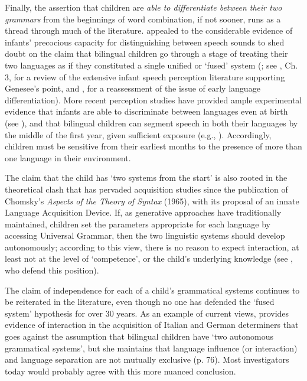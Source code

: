 \documentclass[output=paper]{langscibook}
\begin{document}
Finally, the assertion that children are \textit{able to differentiate between their two grammars} from the beginnings of word combination, if not sooner, runs as a thread through much of the literature. \citet{Genesee1989} appealed to the considerable evidence of infants’ precocious capacity for distinguishing between speech sounds to shed doubt on the claim that bilingual children go through a stage of treating their two languages as if they constituted a single unified or ‘fused’ system (\citealt{Volterra1978}; see \citealt{Vihman2014}, Ch. 3, for a review of the extensive infant speech perception literature supporting Genesee’s point, and \citealt{Byers-Heinlein2014}, for a reassessment of the issue of early language differentiation). More recent perception studies have provided ample experimental evidence that infants are able to discriminate  between languages even at birth (see \citealt{Nazzi1998,Ramus2002,Byers-HeinleinEtAl2010}), and that bilingual children can segment speech in both their languages by the middle of the first year, given sufficient exposure (e.g., \citealt{BoschEtAl2013,Polka2017}). Accordingly, children must be sensitive from their earliest months to the presence of more than one language in their environment.

The claim that the child has ‘two systems from the start’ is also rooted in the theoretical clash that has pervaded acquisition studies since the publication of Chomsky’s \textit{Aspects of the Theory of Syntax} (1965), with its proposal of an innate Language Acquisition Device. If, as generative approaches have traditionally maintained, children set the parameters appropriate for each language by accessing Universal Grammar, then the two linguistic systems should develop autonomously; according to this view, there is no reason to expect interaction, at least not at the level of ‘competence’, or the child’s underlying knowledge (see \citealt{ParadisGenesee1996}, who defend this position).

The claim of independence for each of a child’s grammatical systems continues to be reiterated in the literature, even though no one has defended the ‘fused system’ hypothesis for over 30 years. As an example of current views, \citet{Kupisch2007} provides evidence of interaction in the acquisition of Italian and German determiners that goes against the assumption that bilingual children have ‘two autonomous grammatical systems’, but she maintains that language influence (or interaction) and language separation are not mutually exclusive (p. 76). Most investigators today would probably agree with this more nuanced conclusion. 
\end{document}
